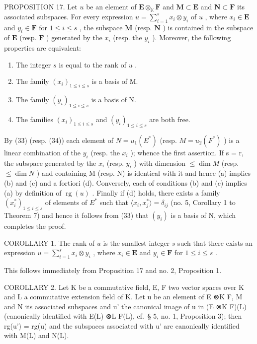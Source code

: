 PROPOSITION 17. Let \(u\) be an element of \(\mathbf{E} \otimes_{\mathbb{K}} \mathbf{F}\) and \(\mathbf{M} \subset \mathbf{E}\) and \(\mathbf{N} \subset \mathbf{F}\) its associated subspaces. For every expression \(u = \sum_{i=1}^{s} x_i \otimes y_i\) of \(u\) , where \(x_i \in \mathbf{E}\) and \(y_i \in \mathbf{F}\) for \(1 \leqslant i \leqslant s\) , the subspace \(\mathbf{M}\) (resp. \(\mathbf{N}\) ) is contained in the subspace of \(\mathbf{E}\) (resp. \(\mathbf{F}\) ) generated by the \(x_i\) (resp. the \(y_i\) ). Moreover, the following properties are equivalent:

\begin{enumerate}
\def\labelenumi{(\alph{enumi})}
\item
  The integer \(s\) is equal to the rank of \(u\) .
\item
  The family \((x_{i})_{1\leqslant i\leqslant s}\) is a basis of M.
\item
  The family \((y_{i})_{1\leqslant i\leqslant s}\) is a basis of N.
\item
  The families \((x_{i})_{1\leqslant i\leqslant s}\) and \((y_{i})_{1\leqslant i\leqslant s}\) are both free.
\end{enumerate}

By (33) (resp. (34)) each element of \(N = u_{1}(E^{*})\) (resp. \(M = u_{2}(F^{*})\) ) is a linear combination of the \(y_{i}\) (resp. the \(x_{i}\) ); whence the first assertion. If s = r, the subspace generated by the \(x_{i}\) (resp. \(y_{i}\) ) with dimension \(\leqslant \dim M\) (resp. \(\leqslant \dim N\) ) and containing M (resp. N) is identical with it and hence (a) implies (b) and (c) and a fortiori (d). Conversely, each of conditions (b) and (c) implies (a) by definition of \(\operatorname{rg}(u)\) . Finally if (d) holds, there exists a family \((x_{i}^{*})_{1\leqslant i\leqslant s}\) of elements of \(E^{*}\) such that \(\langle x_{i}, x_{j}^{*}\rangle = \delta_{ij}\) (no. 5, Corollary 1 to Theorem 7) and hence it follows from (33) that \((y_{i})\) is a basis of N, which completes the proof.

COROLLARY 1. The rank of \(u\) is the smallest integer \(s\) such that there exists an expression \(u = \sum_{i=1}^{s} x_i \otimes y_i\) , where \(x_i \in \mathbf{E}\) and \(y_i \in \mathbf{F}\) for \(1 \leqslant i \leqslant s\) .

This follows immediately from Proposition 17 and no. 2, Proposition 1.

COROLLARY 2. Let K be a commutative field, E, F two vector spaces over K and L a commutative extension field of K. Let u be an element of E ⊗K F, M and N its associated subspaces and u' the canonical image of u in (E ⊗K F)(L) (canonically identified with E(L) ⊗L F(L), cf.~§ 5, no. 1, Proposition 3); then rg(u') = rg(u) and the subspaces associated with u' are canonically identified with M(L) and N(L).

